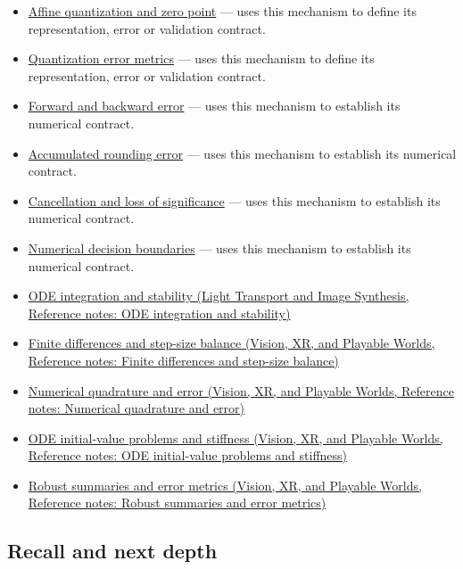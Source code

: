 \begin{itemize}
\item
  \hyperref[appendix-d5da3eaabaef]{Affine quantization and zero point} --- uses this mechanism to define its representation, error or validation contract.
\item
  \hyperref[appendix-537171d69d27]{Quantization error metrics} --- uses this mechanism to define its representation, error or validation contract.
\item
  \hyperref[appendix-a7fbaf6d1b1c]{Forward and backward error} --- uses this mechanism to establish its numerical contract.
\item
  \hyperref[appendix-f82e270791c8]{Accumulated rounding error} --- uses this mechanism to establish its numerical contract.
\item
  \hyperref[appendix-a2773a6a2f9d]{Cancellation and loss of significance} --- uses this mechanism to establish its numerical contract.
\item
  \hyperref[appendix-c80db39080be]{Numerical decision boundaries} --- uses this mechanism to establish its numerical contract.
\item
  \href{../04-Light-Transport-and-Image-Synthesis/main.pdf\#nameddest=appendix-18eacf61a04b}{ODE integration and stability (Light Transport and Image Synthesis, Reference notes: ODE integration and stability)}
\item
  \href{../07-Vision-XR-and-Playable-Worlds/main.pdf\#nameddest=appendix-e2d7b4f2161d}{Finite differences and step-size balance (Vision, XR, and Playable Worlds, Reference notes: Finite differences and step-size balance)}
\item
  \href{../07-Vision-XR-and-Playable-Worlds/main.pdf\#nameddest=appendix-80521eae6b71}{Numerical quadrature and error (Vision, XR, and Playable Worlds, Reference notes: Numerical quadrature and error)}
\item
  \href{../07-Vision-XR-and-Playable-Worlds/main.pdf\#nameddest=appendix-e8ab9836882e}{ODE initial-value problems and stiffness (Vision, XR, and Playable Worlds, Reference notes: ODE initial-value problems and stiffness)}
\item
  \href{../07-Vision-XR-and-Playable-Worlds/main.pdf\#nameddest=appendix-bcc44e9d3d02}{Robust summaries and error metrics (Vision, XR, and Playable Worlds, Reference notes: Robust summaries and error metrics)}
\end{itemize}

\subsection{Recall and next depth}\label{appendix-3ae74e89b4e6-recall-and-next-depth}

